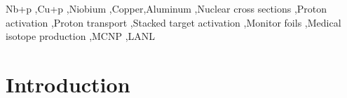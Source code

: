 \documentclass[3p]{elsarticle}
\newcommand{\comment}[1]{\todo[color=blue!20!white,inline]{ASV: #1}}
\begin{document}
\begin{frontmatter}
\begin{abstract}




\end{abstract}

\begin{keyword}
Nb+p \sep Cu+p \sep Niobium \sep Copper\sep Aluminum \sep Nuclear cross sections \sep Proton activation \sep Proton transport \sep Stacked target activation \sep Monitor foils \sep Medical isotope production \sep MCNP \sep  LANL


\end{keyword}

\end{frontmatter}

\listoftodos


\linenumbers



\section{Introduction} \label{sec:intro}

\end{document}
